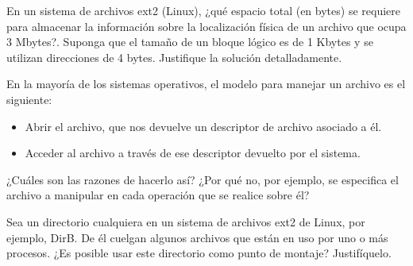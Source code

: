 \begin{ejercicio}
En un sistema de archivos ext2 (Linux), ¿qué espacio total (en bytes) se requiere para almacenar la información sobre la localización física de un archivo que ocupa 3 Mbytes?. Suponga que el tamaño de un bloque lógico es de 1 Kbytes y se utilizan direcciones de 4 bytes. Justifique la solución detalladamente.
\end{ejercicio}

\begin{ejercicio}
En la mayoría de los sistemas operativos, el modelo para manejar un archivo es el siguiente:
\begin{itemize}
    \item Abrir el archivo, que nos devuelve un descriptor de archivo asociado a él.
    \item Acceder al archivo a través de ese descriptor devuelto por el sistema.
\end{itemize}
¿Cuáles son las razones de hacerlo así? ¿Por qué no, por ejemplo, se especifica el archivo a manipular en cada operación que se realice sobre él?
\end{ejercicio}

\begin{ejercicio}
Sea un directorio cualquiera en un sistema de archivos ext2 de Linux, por ejemplo, DirB. De él cuelgan algunos archivos que están en uso por uno o más procesos. ¿Es posible usar este directorio como punto de montaje? Justifíquelo.
\end{ejercicio}